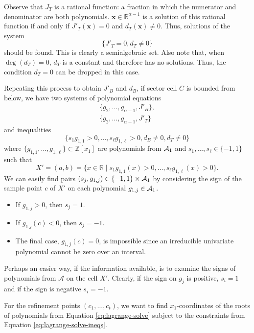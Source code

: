 \documentclass[
]{book}
\providecommand{\tightlist}{%
  \setlength{\itemsep}{0pt}\setlength{\parskip}{0pt}}
\theoremstyle{definition}
\theoremstyle{definition}
\theoremstyle{definition}
\theoremstyle{definition}
\theoremstyle{remark}
\begin{document}
Observe that \(J_T\) is a rational function: a fraction in which the numerator and denominator are both polynomials. \(\mathbf{x} \in \mathbb{R}^{\alpha - 1}\) is a solution of this rational function if and only if \(J'_T(\mathbf{x}) = 0\) and \(d_T(\mathbf{x}) \ne 0\). Thus, solutions of the system \[
\{ J'_T = 0, d_T \ne 0 \}
\] should be found.
This is clearly a semialgebraic set.
Also note that, when \(\deg(d_T) = 0\), \(d_T\) is a constant and therefore has no solutions. Thus, the condition \(d_T = 0\) can be dropped in this case.

Repeating this process to obtain \(J'_B\) and \(d_B\), if sector cell \(C\) is bounded from below, we have two systems of polynomial equations
\begin{align}
\{ g_2,\ldots,g_{\alpha-1}, J'_B \},\\
\{ g_2,\ldots,g_{\alpha-1}, J'_T \}
\label{eq:lagrange-solve}
\end{align}
and inequalities
\begin{equation}
\{ s_1 g_{1,1} > 0, \ldots, s_\ell g_{1,\ell} > 0, d_B \ne 0, d_T \ne 0 \}
\label{eq:lagrange-solve-ineqs}
\end{equation}
where \(\{ g_{1,1},\ldots,g_{1,\ell} \} \subset \mathbb{Z}[x_1]\) are polynomials from \({\cal A}_1\) and \(s_1,\ldots,s_\ell \in \{-1,1\}\) such that \[
X' = (a,b) = \{ x \in \mathbb{R}\mid s_1 g_{1,1}(x) > 0, \ldots, s_\ell g_{1,\ell}(x) > 0\}.
\]
We can easily find pairs \((s_j, g_{1,j}) \in \{-1,1\} \times {\cal A}_1\) by considering the sign of the sample point \(c\) of \(X'\) on each polynomial \(g_{1,j} \in {\cal A}_1\).

\begin{itemize}
\tightlist
\item
  If \(g_{1,j} > 0\), then \(s_j = 1\).
\item
  If \(g_{1.j}(c) < 0\), then \(s_j = -1\).
\item
  The final case, \(g_{1,j}(c) = 0\), is impossible since an irreducible univariate polynomial cannot be zero over an interval.
\end{itemize}

Perhaps an easier way, if the information available, is to examine the signs of polynomials from \(\mathcal{A}\) on the cell \(X'\). Clearly, if the sign on \(g_j\) is positive, \(s_i = 1\) and if the sign is negative \(s_i = -1\).

For the refinement points \((c_1,\ldots,c_t)\), we want to find \(x_1\)-coordinates of the roots of polynomials from Equation \eqref{eq:lagrange-solve} subject to the constraints from Equation \eqref{eq:lagrange-solve-ineqs}.
\end{document}
